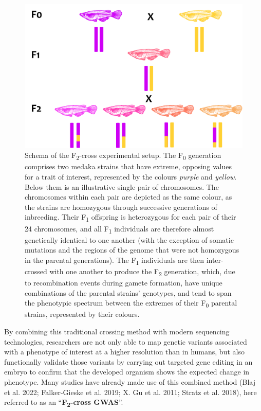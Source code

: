 \documentclass[
]{book}
\begin{document}
\begin{figure}
\includegraphics[width=1\linewidth]{figs/mikk_behaviour/F2-cross-schema} \caption{Schema of the F\textsubscript{2}-cross experimental setup. The F\textsubscript{0} generation comprises two medaka strains that have extreme, opposing values for a trait of interest, represented by the colours \emph{purple} and \emph{yellow}. Below them is an illustrative single pair of chromosomes. The chromosomes within each pair are depicted as the same colour, as the strains are homozygous through successive generations of inbreeding. Their F\textsubscript{1} offspring is heterozygous for each pair of their 24 chromosomes, and all F\textsubscript{1} individuals are therefore almost genetically identical to one another (with the exception of somatic mutations and the regions of the genome that were not homozygous in the parental generations). The F\textsubscript{1} individuals are then inter-crossed with one another to produce the F\textsubscript{2} generation, which, due to recombination events during gamete formation, have unique combinations of the parental strains' genotypes, and tend to span the phenotypic spectrum between the extremes of their F\textsubscript{0} parental strains, represented by their colours.}\label{fig:F2-cross-schema}
\end{figure}

By combining this traditional crossing method with modern sequencing technologies, researchers are not only able to map genetic variants associated with a phenotype of interest at a higher resolution than in humans, but also functionally validate those variants by carrying out targeted gene editing in an embryo to confirm that the developed organism shows the expected change in phenotype. Many studies have already made use of this combined method (Blaj et al. 2022; Falker-Gieske et al. 2019; X. Gu et al. 2011; Stratz et al. 2018), here referred to as an ``\textbf{F\textsubscript{2}-cross GWAS}''.
\end{document}
